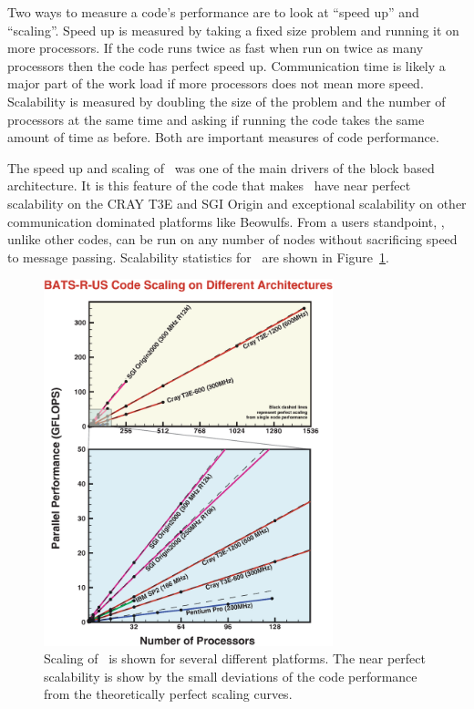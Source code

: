 Two ways to measure a code's performance are to look at ``speed up'' and 
``scaling''.  Speed up is measured by taking a fixed size problem and running
it on more processors.  If the code runs twice as fast when run on twice as 
many processors then the code has perfect speed up.  Communication time is 
likely a major part of the work load if more processors does not mean
more speed.    
Scalability is measured by doubling the size of the problem and the number
of processors at the same time and asking if running the code takes the
same amount of time as before.  
Both are important measures of code performance.

The speed up and scaling of \BATSRUS\ was
one of the main drivers of the block based architecture.  It is this
feature of the code that makes \BATSRUS\ have near perfect scalability
on the CRAY T3E and SGI Origin and exceptional scalability on other
communication dominated platforms like Beowulfs.  From a users standpoint,
\BATSRUS, unlike other codes, can be run on any number of nodes without
sacrificing speed to message passing.  Scalability statistics for \BATSRUS\
are shown in
Figure~\ref{fig:scalability}.
\begin{figure}
\begin{center}
\includegraphics*[width=8.4cm]{NewScaling.eps}
\end{center}
\caption{Scaling of \BATSRUS\ is shown for several different
platforms.  The near perfect scalability is show by the small
deviations of the code performance from the theoretically perfect
scaling curves.}
\label{fig:scalability}
\end{figure}


